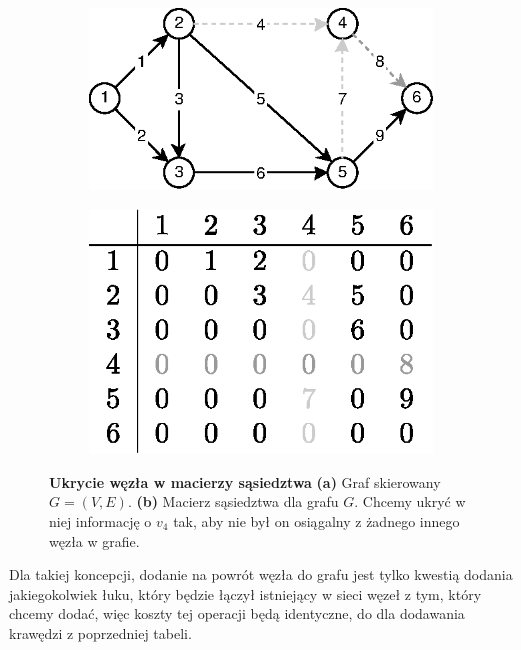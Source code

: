 \begin{figure}[!htbp]
	\centering
	\begin{subfigure}[b]{0.5\textwidth}
		\includegraphics[width=\textwidth]{Chapter_I/6/1_6a.eps}
		\caption{}
	\end{subfigure}%
	\qquad
	\begin{subfigure}[b]{0.4\textwidth}
		\includegraphics[width=\textwidth]{Chapter_I/6/1_6b.eps}
		\caption{}
	\end{subfigure}
	\caption{\textbf{Ukrycie węzła w macierzy sąsiedztwa} \textbf{(a)} Graf skierowany $G = \left( V, E \right)$. \textbf{(b)} Macierz sąsiedztwa dla grafu $G$. Chcemy ukryć w niej informację o $v_{4}$ tak, aby nie był on osiągalny z żadnego innego węzła w grafie. }\label{fig:adjacencyMatrixHideNode}
\end{figure}

Dla takiej koncepcji, dodanie na powrót węzła do grafu jest tylko kwestią dodania jakiegokolwiek łuku, który będzie łączył istniejący w sieci węzeł z tym, który chcemy dodać, więc koszty tej operacji będą identyczne, do dla dodawania krawędzi z poprzedniej tabeli.

